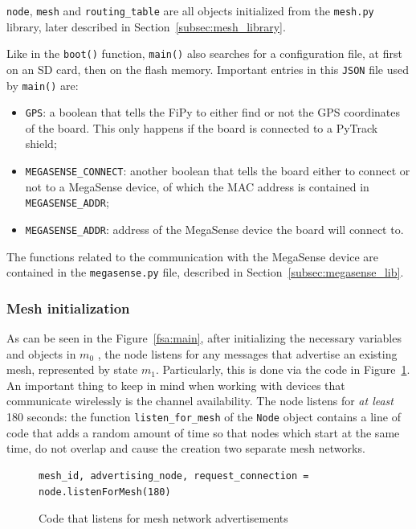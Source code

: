				\texttt{node}, \texttt{mesh} and \texttt{routing\_table} are all objects initialized from the \texttt{mesh.py} library, later described in Section~\ref{subsec:mesh_library}.
				
				Like in the \texttt{boot()} function, \texttt{main()} also searches for a configuration file, at first on an SD card, then on the flash memory.
				Important entries in this \texttt{JSON} file used by \texttt{main()} are:
				\begin{itemize}
					\item \texttt{GPS}: a boolean that tells the FiPy to either find or not the GPS coordinates of the board. This only happens if the board is connected to a PyTrack shield;
					\item \texttt{MEGASENSE\_CONNECT}: another boolean that tells the board either to connect or not to a MegaSense device, of which the MAC address is contained in \texttt{MEGASENSE\_ADDR};
					\item \texttt{MEGASENSE\_ADDR}: address of the MegaSense device the board will connect to.
				\end{itemize}
			
				The functions related to the communication with the MegaSense device are contained in the \texttt{megasense.py} file, described in Section~\ref{subsec:megasense_lib}.
				
			\subsubsection{Mesh initialization}
			
				As can be seen in the Figure~\ref{fsa:main}, after initializing the necessary variables and objects in $ m_0 $ , the node listens for any messages that advertise an existing mesh, represented by state $ m_1 $.
				Particularly, this is done via the code in Figure~\ref{code:mesh_init_1}.
				An important thing to keep in mind when working with devices that communicate wirelessly is the channel availability.
				The node listens for \textit{at least} 180 seconds: the function \texttt{listen\_for\_mesh} of the \texttt{Node} object contains a line of code that adds a random amount of time so that nodes which start at the same time, do not overlap and cause the creation two separate mesh networks.
				
				\begin{figure}[H]
					\begin{lstlisting}
mesh_id, advertising_node, request_connection = node.listenForMesh(180)
					\end{lstlisting}		
					\caption{Code that listens for mesh network advertisements}
					\label{code:mesh_init_1}
				\end{figure}
			
